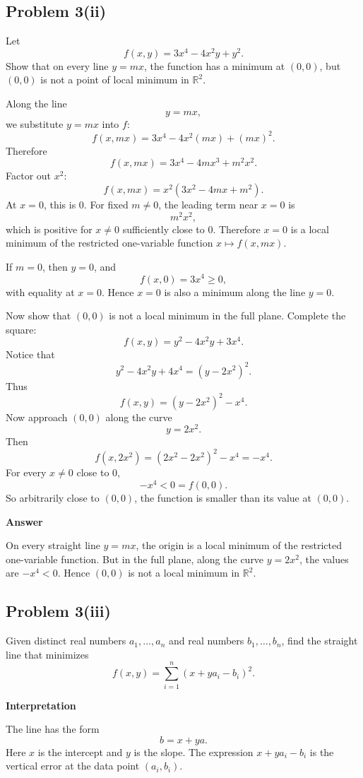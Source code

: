 \documentclass[11pt]{article}
\newenvironment{methodbox}[1]{\par\medskip\noindent\textcolor{lineblue}{\textbf{#1}}\par\smallskip}{\par\medskip}
\newenvironment{answerbox}[1]{\par\medskip\noindent\textcolor{linegreen}{\textbf{#1}}\par\smallskip}{\par\medskip}
\newcommand{\R}{\mathbb{R}}
\begin{document}
\subsection*{Problem 3(ii)}
Let
\[
f(x,y)=3x^4-4x^2y+y^2.
\]
Show that on every line $y=mx$, the function has a minimum at $(0,0)$, but $(0,0)$ is not a point of local minimum in $\R^2$.

Along the line
\[
y=mx,
\]
we substitute $y=mx$ into $f$:
\[
f(x,mx)=3x^4-4x^2(mx)+(mx)^2.
\]
Therefore
\[
f(x,mx)=3x^4-4mx^3+m^2x^2.
\]
Factor out $x^2$:
\[
f(x,mx)=x^2(3x^2-4mx+m^2).
\]
At $x=0$, this is $0$.  For fixed $m\ne0$, the leading term near $x=0$ is
\[
m^2x^2,
\]
which is positive for $x\ne0$ sufficiently close to $0$.  Therefore $x=0$ is a local minimum of the restricted one-variable function $x\mapsto f(x,mx)$.

If $m=0$, then $y=0$, and
\[
f(x,0)=3x^4\ge0,
\]
with equality at $x=0$.  Hence $x=0$ is also a minimum along the line $y=0$.

Now show that $(0,0)$ is not a local minimum in the full plane.  Complete the square:
\[
f(x,y)=y^2-4x^2y+3x^4.
\]
Notice that
\[
y^2-4x^2y+4x^4=(y-2x^2)^2.
\]
Thus
\[
f(x,y)=(y-2x^2)^2-x^4.
\]
Now approach $(0,0)$ along the curve
\[
y=2x^2.
\]
Then
\[
f(x,2x^2)=(2x^2-2x^2)^2-x^4=-x^4.
\]
For every $x\ne0$ close to $0$,
\[
-x^4<0=f(0,0).
\]
So arbitrarily close to $(0,0)$, the function is smaller than its value at $(0,0)$.

\begin{answerbox}{Answer}
On every straight line $y=mx$, the origin is a local minimum of the restricted one-variable function.  But in the full plane, along the curve $y=2x^2$, the values are $-x^4<0$. Hence $(0,0)$ is not a local minimum in $\R^2$.
\end{answerbox}

\subsection*{Problem 3(iii)}
Given distinct real numbers $a_1,\ldots,a_n$ and real numbers $b_1,\ldots,b_n$, find the straight line that minimizes
\[
f(x,y)=\sum_{i=1}^n (x+ya_i-b_i)^2.
\]

\begin{methodbox}{Interpretation}
The line has the form
\[
b=x+ya.
\]
Here $x$ is the intercept and $y$ is the slope. The expression $x+ya_i-b_i$ is the vertical error at the data point $(a_i,b_i)$.
\end{methodbox}
\end{document}
